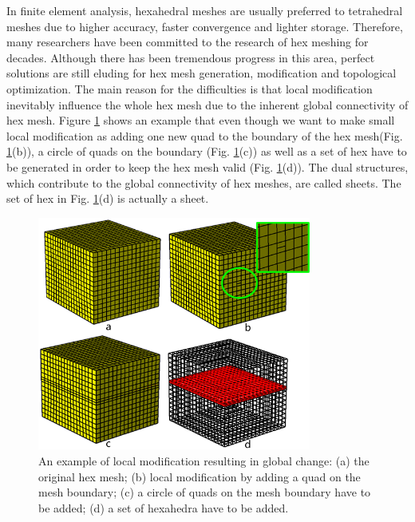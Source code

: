 \documentclass[final,5p,times,twocolumn]{elsarticle}
\begin{document}
In finite element analysis, hexahedral meshes are usually preferred to tetrahedral meshes due to higher accuracy, faster convergence and lighter storage\cite{Shepherd:2007tg,Shepherd:2008dg}. Therefore, many researchers have been committed to the research of hex meshing for decades. Although there has been tremendous progress in this area, perfect solutions are still eluding for hex mesh generation, modification and topological optimization. The main reason for the difficulties is that local modification inevitably influence the whole hex mesh due to the inherent global connectivity of hex mesh\cite{Murdoch:1997fy, Tautges:2003vt, Ledoux:2009cg, Ramos:2014jq}. Figure \ref{fig:global_structure} shows an example that even though we want to make small local modification as adding one new quad to the boundary of the hex mesh(Fig. \ref{fig:global_structure}(b)), a circle of quads on the boundary (Fig. \ref{fig:global_structure}(c)) as well as a set of hex have to be generated in order to keep the hex mesh valid (Fig. \ref{fig:global_structure}(d)). The dual structures, which contribute to the global connectivity of hex meshes, are called sheets. The set of hex in Fig. \ref{fig:global_structure}(d) is actually a sheet.

\begin{figure}[htbp]
\begin{center}
\includegraphics[width=9cm]{rev_figures/global_structure.png}
\caption{An example of local modification resulting in global change: (a) the original hex mesh; (b) local modification by adding a quad on the mesh boundary; (c) a circle of quads on the mesh boundary have to be added; (d) a set of hexahedra have to be added.}
\label{fig:global_structure}
\end{center}
\end{figure}
\end{document}
